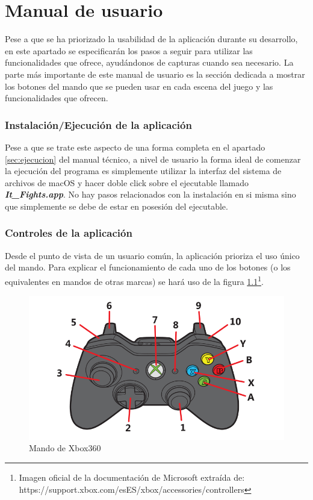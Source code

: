 \chapter{Manual de usuario}

Pese a que se ha priorizado la usabilidad de la aplicación durante su desarrollo, en este apartado se especificarán los pasos a seguir para utilizar las funcionalidades que ofrece, ayudándonos de capturas cuando sea necesario. La parte más importante de este manual de usuario es la sección dedicada a mostrar los botones del mando que se pueden usar en cada escena del juego y las funcionalidades que ofrecen.

\subsection{Instalación/Ejecución de la aplicación}

Pese a que se trate este aspecto de una forma completa en el apartado \ref{sec:ejecucion} del manual técnico, a nivel de usuario la forma ideal de comenzar la ejecución del programa es simplemente utilizar la interfaz del sistema de archivos de macOS y hacer doble click sobre el ejecutable llamado \textbf{\textit{It\_Fights.app}}. No hay pasos relacionados con la instalación en si misma sino que simplemente se debe de estar en posesión del ejecutable.


\subsection{Controles de la aplicación}

Desde el punto de vista de un usuario común, la aplicación prioriza el uso único del mando. Para explicar el funcionamiento de cada uno de los botones (o los equivalentes en mandos de otras marcas) se hará uso de la figura \ref{controles:mando}\footnote{Imagen oficial de la documentación de Microsoft extraída de: \\ https://support.xbox.com/es\-ES/xbox/accessories/controllers}.

\begin{figure}
	\centerline{\includegraphics[width=12cm]{otros/graphicalInterface/mando.png}}
	\caption{Mando de Xbox360}
	\label{controles:mando}
\end{figure}

